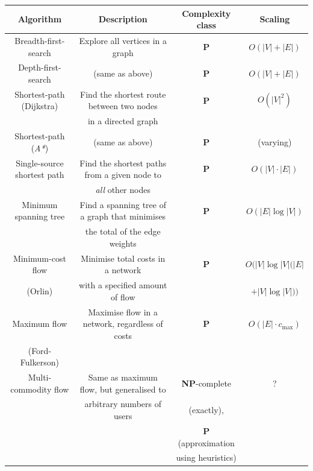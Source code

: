 \startnormtable
\begin{table}[!htbp]
	\begin{tabular}{|c|c|c|c|}
		\hline
  		\rowcolor{Dandelion} Algorithm & Description & Complexity class & Scaling \\
  		\hline
  		\hline
  		\rowcolor{LimeGreen} Breadth-first-search & Explore all vertices in a graph & \textbf{P} & $O(|V|+|E|)$ \\
  		\hline
  		\rowcolor{LimeGreen} Depth-first-search & (same as above) & \textbf{P} & $O(|V|+|E|)$ \\
		\hline
  		\rowcolor{LimeGreen} Shortest-path (Dijkstra) & Find the shortest route between two nodes & \textbf{P} & $O(|V|^2)$ \\
  		\rowcolor{LimeGreen} & in a directed graph & &  \\
  		  		\hline
		\rowcolor{LimeGreen} Shortest-path (\textit{A*}) & (same as above) & \textbf{P} & (varying) \\
  		  		\hline
		\rowcolor{LimeGreen} Single-source shortest path & Find the shortest paths from a given node to & \textbf{P} & $O(|V|\cdot |E|)$\\
  		\rowcolor{LimeGreen} & \textit{all} other nodes & & \\
 		\hline
		\rowcolor{LimeGreen} Minimum spanning tree & Find a spanning tree of a graph that minimises & \textbf{P} & $O(|E|\log |V|)$ \\
  		\rowcolor{LimeGreen} & the total of the edge weights & & \\
  		\hline
  		\rowcolor{LimeGreen} Minimum-cost flow & Minimise total costs in a network &  \textbf{P} & $O(|V|\log |V|(|E|$\\
  		\rowcolor{LimeGreen} (Orlin) & with a specified amount of flow& & $+|V|\log |V|))$ \\
  		\hline
  		\rowcolor{LimeGreen} Maximum flow & Maximise flow in a network, regardless of costs & \textbf{P} & $O(|E|\cdot c_\mathrm{max})$ \\
  		\rowcolor{LimeGreen} (Ford-Fulkerson) & & & \\
  		\hline
  		\rowcolor{Lavender} Multi-commodity flow & Same as maximum flow, but generalised to & \textbf{NP}-complete & ? \\
  		\rowcolor{Lavender} & arbitrary numbers of users & (exactly), & \\
  		\rowcolor{Lavender} & & \textbf{P} (approximation & \\
  		\rowcolor{Lavender} & & using heuristics) & \\

\end{tabular}
\end{table}
